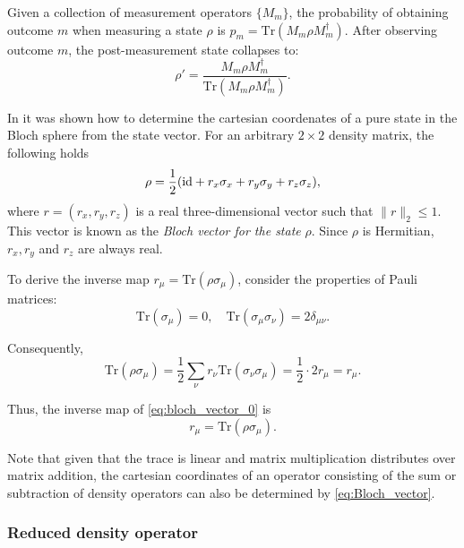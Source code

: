 \begin{definition}
  Given a collection of measurement operators \( \{M_m\} \), the probability of obtaining outcome \( m \) when measuring a state \( \rho \) is $p_m = \text{Tr}(M_m \rho M_m^\dagger).$
  After observing outcome $ m $, the post-measurement state collapses to:
  \[
  \rho' = \frac{M_m \rho M_m^\dagger}{\text{Tr}(M_m \rho M_m^\dagger)}.
  \]
\end{definition}


\begin{definition}
  In  it was shown how to determine the cartesian coordenates of a pure state in the Bloch sphere from the state vector. For an arbitrary $2 \times 2$ density matrix, the following holds
\begin{equation} \label{eq:bloch_vector_0}
  \rho = \frac{1}{2}(\mathrm{id} + r_{x}\sigma_{x} + r_{y}\sigma_{y} + r_{z}\sigma_{z}),
\end{equation}
where $r = (r_x, r_y, r_z)$ is a real three-dimensional vector such that $\| r \|_2 \leq 1$. This vector is known as the \emph{Bloch vector for the state} $\rho$. Since $\rho$ is Hermitian, $r_x, r_y$ and $r_z$ are always real.  

To derive the inverse map \( r_\mu = \text{Tr}(\rho \sigma_\mu) \), consider the properties of Pauli matrices:
\[
\text{Tr}(\sigma_\mu) = 0, \quad \text{Tr}(\sigma_\mu \sigma_\nu) = 2 \delta_{\mu \nu}.
\]

Consequently,
\[
\text{Tr}(\rho \sigma_\mu) = \frac{1}{2} \sum_{\nu} r_\nu \text{Tr}(\sigma_\nu \sigma_\mu) = \frac{1}{2} \cdot 2 r_\mu = r_\mu.
\]

Thus, the inverse map of \autoref{eq:bloch_vector_0} is
\begin{equation}
  \label{eq:Bloch_vector}
  r_{\mu} = \text{Tr}(\rho \sigma_{\mu}).
  \end{equation} 
\end{definition}


  Note that given that the trace is linear and matrix multiplication distributes over matrix addition, the cartesian coordinates of an operator consisting of the sum or subtraction of density operators can also be determined by \autoref{eq:Bloch_vector}.

\subsubsection{Reduced density operator}

